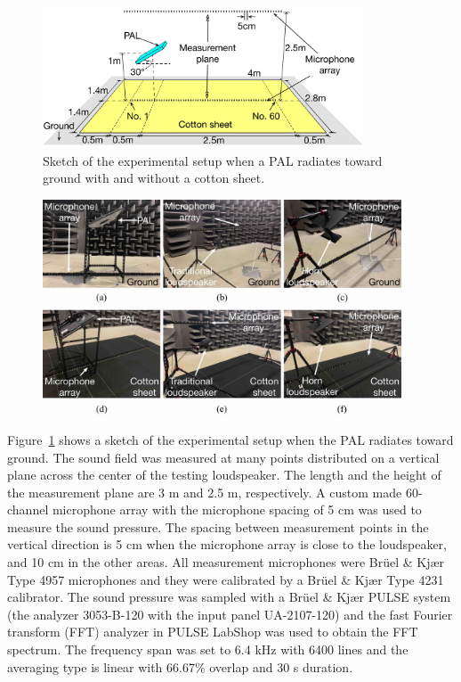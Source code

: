 \begin{figure}[!htb]
    \centering
    \includegraphics[width = 0.85\textwidth]{Figures/pending/ExperimentSetup.pdf}
    \caption{Sketch of the experimental setup when a PAL radiates toward ground with and without a cotton sheet.}
    \label{fig:reflection:exp:setup}
\end{figure}

\begin{figure}[!htb]
    \centering
    \includegraphics[width = 0.95\textwidth]{Figures/pending/ExperimentSetup_v2.jpg}
    \caption{}
    \label{fig:reflection:exp:photo}
\end{figure}

Figure~\ref{fig:reflection:exp:setup} shows a sketch of the experimental setup when the PAL radiates toward ground. The sound field was measured at many points distributed on a vertical plane across the center of the testing loudspeaker. The length and the height of the measurement plane are 3 m and 2.5 m, respectively. A custom made 60-channel microphone array with the microphone spacing of 5 cm was used to measure the sound pressure. The spacing between measurement points in the vertical direction is 5 cm when the microphone array is close to the loudspeaker, and 10 cm in the other areas. All measurement microphones were Brüel \& Kjær Type 4957 microphones and they were calibrated by a Brüel \& Kjær Type 4231 calibrator. The sound pressure was sampled with a Brüel \& Kjær PULSE system (the analyzer 3053-B-120 with the input panel UA-2107-120) and the fast Fourier transform (FFT) analyzer in PULSE LabShop was used to obtain the FFT spectrum. The frequency span was set to 6.4 kHz with 6400 lines and the averaging type is linear with 66.67\% overlap and 30 s duration.

